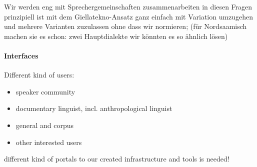 \documentclass[a4paper,12pt]{article}
\begin{document}
Wir werden eng mit Sprechergemeinschaften zusammenarbeiten in diesen Fragen
prinzipiell ist mit dem Giellatekno-Ansatz ganz einfach mit Variation umzugehen und mehrere Varianten zuzulassen ohne dass wir normieren; (für Nordsaamisch machen sie es schon: zwei Hauptdialekte wir könnten es so ähnlich lösen)

\paragraph{Interfaces}%
Different kind of users:
\begin{itemize}
\item speaker community
\item documentary linguist, incl. anthropological linguist
\item general and corpus
\item other interested users
\end{itemize}

different kind of portals to our created infrastructure and tools is needed!




\end{document}
